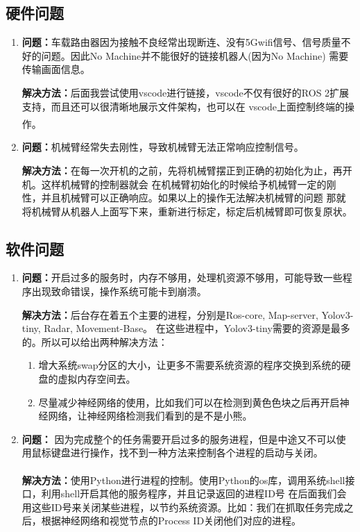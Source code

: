\documentclass[a4paper,twoside]{article}
\newcommand{\upcite}[1]{\textsuperscript{\textsuperscript{\cite{#1}}}}
\begin{document}
\subsection{硬件问题}
\begin{enumerate}
	\item
	      \textbf{问题：}车载路由器因为接触不良经常出现断连、没有5Gwifi信号、信号质量不好的问题。因此No Machine并不能很好的链接机器人(因为No Machine)
	      需要传输画面信息。

	      \textbf{解决方法：}后面我尝试使用vscode进行链接，vscode不仅有很好的ROS 2扩展支持，而且还可以很清晰地展示文件架构，也可以在
	      vscode上面控制终端的操作。\upcite{roswithvsc}
	\item \textbf{问题：}机械臂经常失去刚性，导致机械臂无法正常响应控制信号。

	      \textbf{解决方法：}在每一次开机的之前，先将机械臂摆正到正确的初始化为止，再开机。这样机械臂的控制器就会
	      在机械臂初始化的时候给予机械臂一定的刚性，并且机械臂可以正确响应。如果以上的操作无法解决机械臂的问题
	      那就将机械臂从机器人上面写下来，重新进行标定，标定后机械臂即可恢复原状。
\end{enumerate}
\subsection{软件问题}
\begin{enumerate}
	\item \textbf{问题：}开启过多的服务时，内存不够用，处理机资源不够用，可能导致一些程序出现致命错误，操作系统可能卡到崩溃。

	      \textbf{解决方法：}后台存在着五个主要的进程，分别是Ros-core, Map-server, Yolov3-tiny, Radar, Movement-Base。
	      在这些进程中，Yolov3-tiny需要的资源是最多的。所以可以给出两种解决方法：
	      \begin{enumerate}
		      \item 增大系统swap分区的大小，让更多不需要系统资源的程序交换到系统的硬盘的虚拟内存空间去。
		      \item 尽量减少神经网络的使用，比如我们可以在检测到黄色色块之后再开启神经网络，让神经网络检测我们看到的是不是小熊。
	      \end{enumerate}
	\item \textbf{问题：} 因为完成整个的任务需要开启过多的服务进程，但是中途又不可以使用鼠标键盘进行操作，找不到一种方法来控制各个进程的启动与关闭。

	      \textbf{解决方法：}使用Python进行进程的控制。使用Python的os库\upcite{ospackage}，调用系统shell接口，利用shell开启其他的服务程序，并且记录返回的进程ID号
	      在后面我们会用这些ID号来关闭某些进程，以节约系统资源。比如：我们在抓取任务完成之后，根据神经网络和视觉节点的Process ID关闭他们对应的进程。
\end{enumerate}
\end{document}
